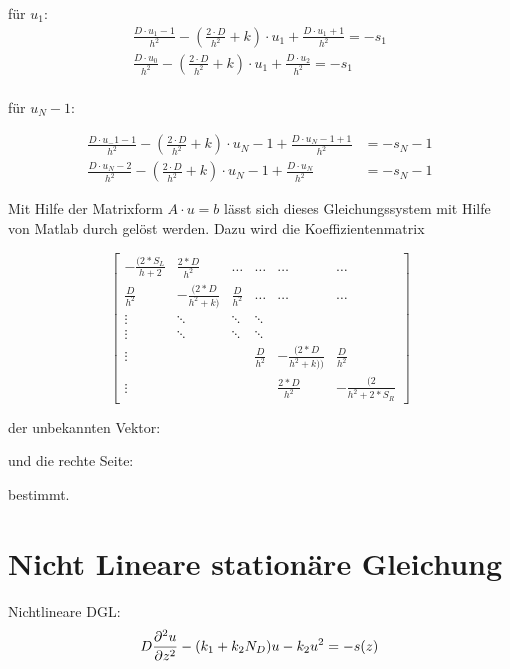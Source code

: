 für $ u_1$:
\begin{equation}
	\begin{split}
		\frac{D\cdot u_1-1}{h^2}-(\frac{2\cdot D}{h^2} + k)\cdot u_1  + \frac{D\cdot u_1+1}{h^2} = -s_1\\
		\frac{D\cdot u_0}{h^2}-(\frac{2\cdot D}{h^2} + k)\cdot u_1  + \frac{D\cdot u_2}{h^2} = -s_1\\
	\end{split}
\end{equation}


für $ u_N-1$:

\begin{align*}
	\frac{D\cdot u_-1-1}{h^2}-(\frac{2\cdot D}{h^2} + k)\cdot u_N-1  + \frac{D\cdot u_N-1+1}{h^2} &= -s_N-1\\
	\frac{D\cdot u_N-2}{h^2} - (\frac{2\cdot D}{h^2} + k)\cdot u_N-1  + \frac{D\cdot u_N}{h^2} &
	= -s_N-1
\end{align*}

Mit Hilfe der Matrixform $ A\cdot u = b $ lässt sich dieses Gleichungssystem mit Hilfe von Matlab durch  gelöst werden. Dazu wird die Koeffizientenmatrix

\begin{equation}
	\begin{bmatrix}
		-\frac{(2*S_L}{h + 2} & \frac{2*D}{h^2} & \dots &  \dots &  \dots &  \dots \\
		\frac{D}{h^2} & -\frac{(2*D}{h^2 + k)} & \frac{D}{h^2} &  \dots &  \dots &  \dots \\
	\vdots	&  \ddots &  \ddots &  \ddots &  &  \\
	\vdots	& \ddots & \ddots & \ddots &  &  \\
	\vdots	&  &  & \frac{D}{h^2} & -\frac{(2*D}{h^2 + k))} & \frac{D}{h^2} \\
	\vdots	&  &  &  & \frac{2*D}{h^2} & -\frac{(2}{h^2 + 2*S_R} 
	\end{bmatrix}
\end{equation}
 

der unbekannten Vektor:


und die rechte Seite:


bestimmt.

\section{Nicht Lineare stationäre Gleichung}
Nichtlineare DGL:
\begin{equation}
	D\pdv[order={2}]{u}{z}-(k_1+k_2N_D)u-k_2u^2=-s(z)
\end{equation}

